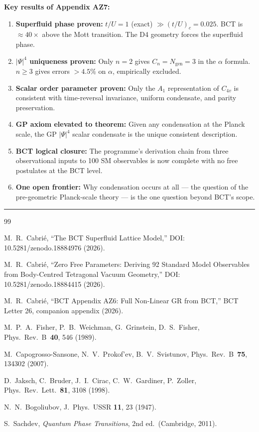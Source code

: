 \documentclass[11pt,a4paper]{article}
\theoremstyle{bctthm}
\theoremstyle{definition}
\begin{document}
\noindent\textbf{Key results of Appendix AZ7:}
\begin{enumerate}
\item \textbf{Superfluid phase proven:} $t/U = 1$ (exact) $\gg (t/U)_c = 0.025$.
BCT is $\approx 40\times$ above the Mott transition. The D4 geometry
forces the superfluid phase.
\item \textbf{$|\Psi|^4$ uniqueness proven:} Only $n=2$ gives
$C_n = N_\mathrm{gen} = 3$ in the $\alpha$ formula. $n \geq 3$
gives errors $> 4.5\%$ on $\alpha$, empirically excluded.
\item \textbf{Scalar order parameter proven:} Only the $A_1$
representation of $C_{4v}$ is consistent with time-reversal
invariance, uniform condensate, and parity preservation.
\item \textbf{GP axiom elevated to theorem:} Given any condensation
at the Planck scale, the GP $|\Psi|^4$ scalar condensate
is the unique consistent description.
\item \textbf{BCT logical closure:} The programme's derivation chain
from three observational inputs to 100 SM observables is now
complete with no free postulates at the BCT level.
\item \textbf{One open frontier:} Why condensation occurs at all —
the question of the pre-geometric Planck-scale theory — is
the one question beyond BCT's scope.
\end{enumerate}

\noindent\rule{\textwidth}{0.6pt}

\begin{thebibliography}{99}

M.~R.~Cabri\'e,
``The BCT Superfluid Lattice Model,''
DOI: 10.5281/zenodo.18884976 (2026).

M.~R.~Cabri\'e,
``Zero Free Parameters: Deriving 92 Standard Model Observables
from Body-Centred Tetragonal Vacuum Geometry,''
DOI: 10.5281/zenodo.18884415 (2026).

M.~R.~Cabri\'e,
``BCT Appendix AZ6: Full Non-Linear GR from BCT,''
BCT Letter 26, companion appendix (2026).

M.~P.~A.~Fisher, P.~B.~Weichman, G.~Grinstein, D.~S.~Fisher,
Phys.\ Rev.\ B~\textbf{40}, 546 (1989).

M.~Capogrosso-Sansone, N.~V.~Prokof'ev, B.~V.~Svistunov,
Phys.\ Rev.\ B~\textbf{75}, 134302 (2007).

D.~Jaksch, C.~Bruder, J.~I.~Cirac, C.~W.~Gardiner, P.~Zoller,
Phys.\ Rev.\ Lett.\ \textbf{81}, 3108 (1998).

N.~N.~Bogoliubov,
J.\ Phys.\ USSR \textbf{11}, 23 (1947).

S.~Sachdev,
\emph{Quantum Phase Transitions}, 2nd ed.\ (Cambridge, 2011).

\end{thebibliography}
\end{document}

